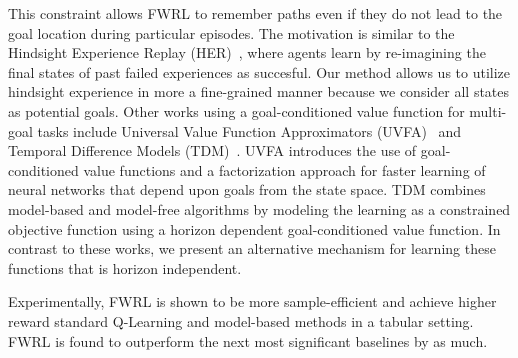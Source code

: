 This constraint allows FWRL to remember paths even if they do not lead
to the goal location during particular episodes. The motivation is
similar to the Hindsight Experience Replay
(HER)~\citep{anderson2017vision}, where agents learn by re-imagining the
final states of past failed experiences as succesful. Our method allows
us to utilize hindsight experience in more a fine-grained manner because
we consider all states as potential goals. Other works using a
goal-conditioned value function for multi-goal tasks include Universal
Value Function Approximators (UVFA)~\citep{schaul2015universal} and
Temporal Difference Models (TDM)~\citep{pong2018temporal}. UVFA
introduces the use of goal-conditioned value functions and a
factorization approach for faster learning of neural networks that
depend upon goals from the state space.  TDM combines model-based and
model-free algorithms by modeling the learning as a constrained
objective function using a horizon dependent goal-conditioned value
function. In contrast to these works, we present an alternative
mechanism for learning these functions that is horizon independent.  


Experimentally, FWRL is shown to be more sample-efficient and achieve
higher reward standard Q-Learning and model-based methods in a
tabular setting.  FWRL is found to outperform the next most significant
baselines by as much.  





